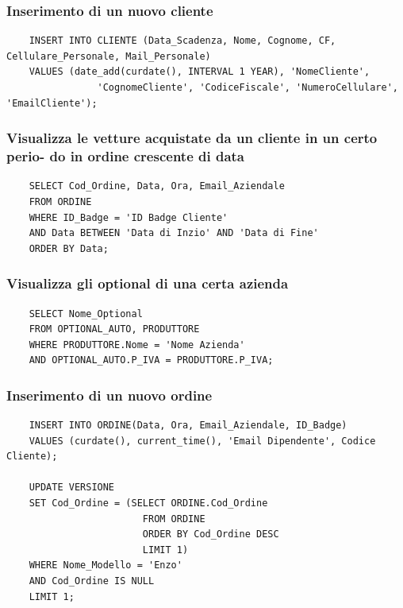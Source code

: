 \documentclass[12pt]{article}
\begin{document}
\subsubsection*{Inserimento di un nuovo cliente}

\begin{lstlisting}
    INSERT INTO CLIENTE (Data_Scadenza, Nome, Cognome, CF, Cellulare_Personale, Mail_Personale)
    VALUES (date_add(curdate(), INTERVAL 1 YEAR), 'NomeCliente', 
                'CognomeCliente', 'CodiceFiscale', 'NumeroCellulare', 'EmailCliente');
\end{lstlisting}

\subsubsection*{Visualizza le vetture acquistate da un cliente in un certo perio-
do in ordine crescente di data}

\begin{lstlisting}
    SELECT Cod_Ordine, Data, Ora, Email_Aziendale 
    FROM ORDINE
    WHERE ID_Badge = 'ID Badge Cliente' 
    AND Data BETWEEN 'Data di Inzio' AND 'Data di Fine'
    ORDER BY Data;
\end{lstlisting}

\subsubsection*{Visualizza gli optional di una certa azienda}
\begin{lstlisting}
    SELECT Nome_Optional
    FROM OPTIONAL_AUTO, PRODUTTORE
    WHERE PRODUTTORE.Nome = 'Nome Azienda'
    AND OPTIONAL_AUTO.P_IVA = PRODUTTORE.P_IVA;
\end{lstlisting}

\subsubsection*{Inserimento di un nuovo ordine}
\begin{lstlisting}
    INSERT INTO ORDINE(Data, Ora, Email_Aziendale, ID_Badge) 
    VALUES (curdate(), current_time(), 'Email Dipendente', Codice Cliente);

    UPDATE VERSIONE
    SET Cod_Ordine = (SELECT ORDINE.Cod_Ordine
                        FROM ORDINE
                        ORDER BY Cod_Ordine DESC
                        LIMIT 1)
    WHERE Nome_Modello = 'Enzo'
    AND Cod_Ordine IS NULL
    LIMIT 1;
\end{lstlisting}
\end{document}
